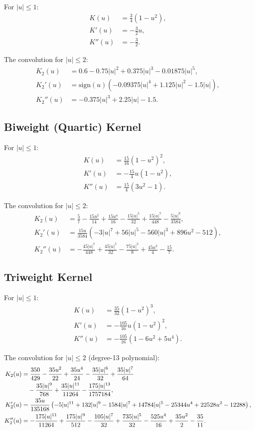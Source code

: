\documentclass[11pt]{article}
\theoremstyle{definition}
\theoremstyle{remark}
\begin{document}
For $|u| \leq 1$:
\begin{align}
K(u) &= \frac{3}{4}(1 - u^2), \\
K'(u) &= -\frac{3}{2} u, \\
K''(u) &= -\frac{3}{2}.
\end{align}

The convolution for $|u| \leq 2$:
\begin{align}
K_2(u) &= 0.6 - 0.75|u|^2 + 0.375|u|^3 - 0.01875|u|^5, \\
K_2'(u) &= \mathrm{sign}(u) \left( -0.09375|u|^4 + 1.125|u|^2 - 1.5|u| \right), \\
K_2''(u) &= -0.375|u|^3 + 2.25|u| - 1.5.
\end{align}

\subsection{Biweight (Quartic) Kernel}

For $|u| \leq 1$:
\begin{align}
K(u) &= \frac{15}{16}(1 - u^2)^2, \\
K'(u) &= -\frac{15}{4} u (1 - u^2), \\
K''(u) &= \frac{15}{4} (3u^2 - 1).
\end{align}

The convolution for $|u| \leq 2$:
\begin{align}
K_2(u) &= \frac{5}{7} - \frac{15u^2}{14} + \frac{15u^4}{16} - \frac{15|u|^5}{32} + \frac{15|u|^7}{448} - \frac{5|u|^9}{3584}, \\
K_2'(u) &= \frac{15u}{3584}\left( -3|u|^7 + 56|u|^5 - 560|u|^3 + 896u^2 - 512 \right), \\
K_2''(u) &= -\frac{45|u|^7}{448} + \frac{45|u|^5}{32} - \frac{75|u|^3}{8} + \frac{45u^2}{4} - \frac{15}{7}.
\end{align}

\subsection{Triweight Kernel}

For $|u| \leq 1$:
\begin{align}
K(u) &= \frac{35}{32}(1 - u^2)^3, \\
K'(u) &= -\frac{105}{16} u (1 - u^2)^2, \\
K''(u) &= -\frac{105}{16} (1 - 6u^2 + 5u^4).
\end{align}

The convolution for $|u| \leq 2$ (degree-13 polynomial):
\begin{align}
K_2(u) &= \frac{350}{429} - \frac{35u^2}{22} + \frac{35u^4}{24} - \frac{35|u|^6}{32} + \frac{35|u|^7}{64} \notag \\
       &\quad - \frac{35|u|^9}{768} + \frac{35|u|^{11}}{11264} - \frac{175|u|^{13}}{1757184}, \\
K_2'(u) &= \frac{35u}{135168}\left( -5|u|^{11} + 132|u|^9 - 1584|u|^7 + 14784|u|^5 - 25344u^4 + 22528u^2 - 12288 \right), \\
K_2''(u) &= -\frac{175|u|^{11}}{11264} + \frac{175|u|^9}{512} - \frac{105|u|^7}{32} + \frac{735|u|^5}{32} - \frac{525u^4}{16} + \frac{35u^2}{2} - \frac{35}{11}.
\end{align}
\end{document}
